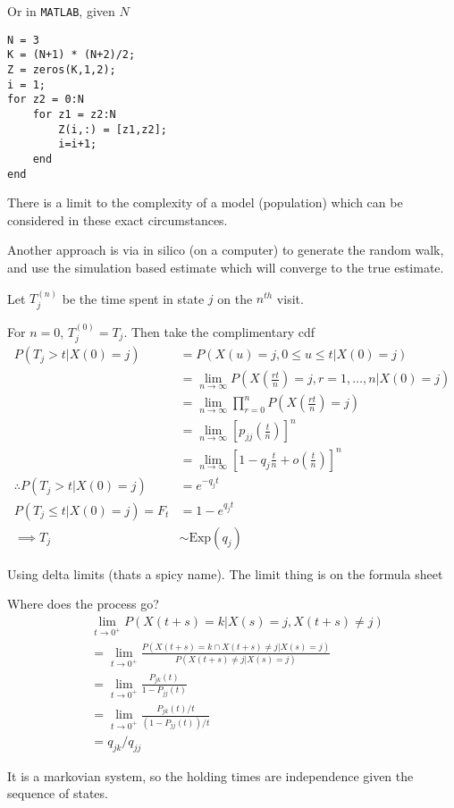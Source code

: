 \documentclass{X:/Documents/Coding/Latex/myassignment}
\begin{document}
Or in \verb|MATLAB|, given $N$

\begin{verbatim}
N = 3
K = (N+1) * (N+2)/2;
Z = zeros(K,1,2);
i = 1;
for z2 = 0:N
    for z1 = z2:N
        Z(i,:) = [z1,z2];
        i=i+1;
    end
end
\end{verbatim}



There is a limit to the complexity of a model (population) which can be considered in these exact circumstances.


Another approach is via in silico (on a computer) to generate the random walk, and use the simulation based estimate which will converge to the true estimate.


Let $T_j^{(n)}$ be the time spent in state $j$ on the $n^{th}$ visit.

For $n=0$, $T_j^{(0)} = T_j$. Then take the complimentary cdf
\begin{align*}
P(T_j > t | X(0)=j) &= P(X(u) = j, 0 \leq u \leq t | X(0)=j)\\
&= \lim_{n\to\infty} P(X(\frac{rt}{n}) = j, r=1,\hdots,n |X(0) = j)\\
&= \lim_{n\to\infty} \prod_{r=0}^n P(X(\frac{rt}{n})= j)\\
&=\lim_{n\to\infty} [p_{jj}(\frac tn)]^{n}\\
&=\lim_{n\to\infty} [1- q_j \frac tn + o(\frac tn) ]^{n}\\
\therefore P(T_j > t |X(0) = j)  &= e^{-q_jt}\\
P(T_j \leq t | X(0) =j) = F_t &= 1-e^{q_j t}\\
\implies T_j&\sim \text{Exp}(q_j)
\end{align*}

Using delta limits (thats a spicy name). The limit thing is on the formula sheet

Where does the process go?
\begin{align*}
    &\lim_{t\to0^+} P(X(t+s)=k | X(s) = j, X(t+s)\neq j)\\
    &=\lim_{t\to0^+}  \frac{P(X(t+s)=k\cap X(t+s)\neq j | X(s) = j)}{P(X(t+s)\neq j | X(s)=j)}\\
    &=\lim_{t\to0^+}  \frac{P_{jk}(t)}{1-P_{jj}(t)}\\
    &=\lim_{t\to0^+}  \frac{P_{jk}(t)/t}{(1-P_{jj}(t))/t}\\
    &=q_{jk}/q_{jj}
\end{align*}

It is a markovian system, so the holding times are independence given the sequence of states.
\end{document}
